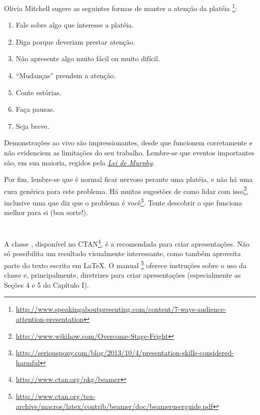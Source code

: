 Olivia Mitchell sugere as seguintes formas de manter a atenção da platéia%
\footnote{\url{http://www.speakingaboutpresenting.com/content/7-ways-audience-attention-presentation}}:
\begin{enumerate}
  \item Fale sobre algo que interesse a platéia.
  \item Diga porque deveriam prestar atenção.
  \item Não apresente algo muito fácil ou muito difícil.
  \item ``Mudanças'' prendem a atenção.
  \item Conte estórias.
  \item Faça pausas.
  \item Seja breve.
\end{enumerate}

Demonstrações ao vivo são impressionantes, desde que funcionem corretamente e não
evidenciem as limitações do seu trabalho. Lembre-se que eventos importantes são,
em sua maioria, regidos pela \emph{\href{http://www.humornaciencia.com.br/miscelanea/murphy.htm}{Lei de Murphy}}.%

Por fim, lembre-se que é normal ficar nervoso perante uma platéia, e não há uma
cura genérica para este problema. Há muitas sugestões de como lidar com isso\footnote{\url{http://www.wikihow.com/Overcome-Stage-Fright}},
inclusive uma que diz que o problema é você\footnote{\url{http://seriouspony.com/blog/2013/10/4/presentation-skills-considered-harmful}}.
Tente descobrir o que funciona melhor para si (boa sorte!).

\newcommand{\beamer}{{}}%
\section{\beamer}
A classe \beamer, disponível no \acrshort{CTAN}\footnote{\url{http://www.ctan.org/pkg/beamer}},
é a recomendada para criar apresentações. Não só possibilita um resultado visualmente
interessante, como também aproveita parte do texto escrito em \LaTeX. O manual%
\footnote{\url{http://www.ctan.org/tex-archive/macros/latex/contrib/beamer/doc/beameruserguide.pdf}}
oferece instruções sobre o uso da classe e, principalmente, diretrizes para criar
apresentações (especialmente as Seções 4 e 5 do Capítulo I).
